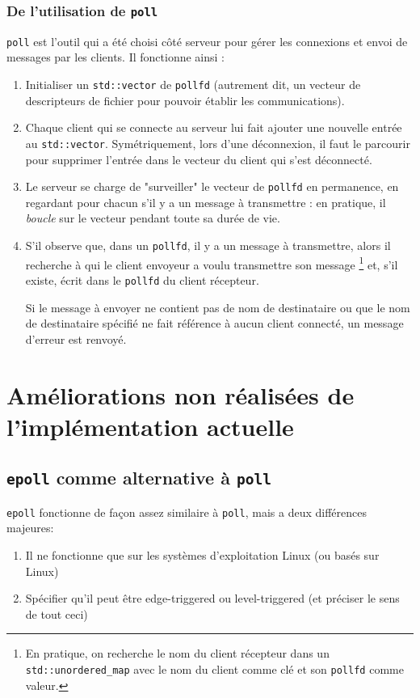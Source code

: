 \documentclass{article}
\begin{document}
\subsubsection{De l'utilisation de \texttt{poll}}
\texttt{poll} est l'outil qui a été choisi côté serveur pour gérer les connexions et envoi de messages par les clients. Il fonctionne ainsi : 
\begin{enumerate}
    \item Initialiser un \texttt{std::vector} de \texttt{pollfd} (autrement dit, un vecteur de descripteurs de fichier pour pouvoir établir les communications). 
    \item Chaque client qui se connecte au serveur lui fait ajouter une nouvelle entrée au \texttt{std::vector}. Symétriquement, lors d'une déconnexion, il faut le parcourir pour supprimer l'entrée dans le vecteur du client qui s'est déconnecté.
    \item Le serveur se charge de "surveiller" le vecteur de \texttt{pollfd} en permanence, en regardant pour chacun s'il y a un message à transmettre : en pratique, il \textit{boucle} sur le vecteur pendant toute sa durée de vie. 
    \item S'il observe que, dans un \texttt{pollfd}, il y a un message à transmettre, alors il recherche à qui le client envoyeur a voulu transmettre son message \footnote{En pratique, on recherche le nom du client récepteur dans un \texttt{std::unordered\_map} avec le nom du client comme clé et son \texttt{pollfd} comme valeur.} et, s'il existe, écrit dans le \texttt{pollfd} du client récepteur.

    Si le message à envoyer ne contient pas de nom de destinataire ou que le nom de destinataire spécifié ne fait référence à aucun client connecté, un message d'erreur est renvoyé. 
\end{enumerate}


\section{Améliorations non réalisées de l'implémentation actuelle}
\subsection{\texttt{epoll} comme alternative à \texttt{poll}}
\texttt{epoll} fonctionne de façon assez similaire à \texttt{poll}, mais a deux différences majeures:
\begin{enumerate}
    \item Il ne fonctionne que sur les systèmes d'exploitation Linux (ou basés sur Linux)
    \item Spécifier qu'il peut être edge-triggered ou level-triggered (et préciser le sens de tout ceci)
\end{enumerate}
\end{document}
